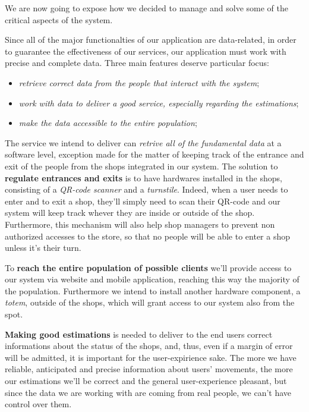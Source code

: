We are now going to expose how we decided to manage and solve some of the critical aspects of the system.

 Since all of the major functionalties of our application are data-related, in order to guarantee the effectiveness of our services, our application must work with precise and complete data. Three main features deserve particular focus:
\begin{itemize}[topsep=0pt]
    \item \textit{retrieve correct data from the people that interact with the system};
    \item \textit{work with data to deliver a good service, especially regarding the estimations};
    \item \textit{make the data accessible to the entire population};
\end{itemize}

The service we intend to deliver can \textit{retrive all of the fundamental data} at a software level, exception made for the matter of keeping track of the entrance and exit of the people from the shops integrated in our system. The solution to \textbf{regulate entrances and exits} is to have hardwares installed in the shops, consisting of a \textit{QR-code scanner} and a \textit{turnstile}. Indeed, when a user needs to enter and to exit a shop, they'll simply need to scan their QR-code and our system will keep track whever they are inside or outside of the shop. Furthermore, this mechanism will also help shop managers to prevent non authorized accesses to the store, so that no people will be able to enter a shop unless it's their turn.

To \textbf{reach the entire population of possible clients} we'll provide access to our system via website and mobile application, reaching this way the majority of the population. Furthermore we intend to install another hardware component, a \textit{totem}, outside of the shops, which will grant access to our system also from the spot.

\textbf{Making good estimations} is needed to deliver to the end users correct informations about the status of the shops, and, thus, even if a margin of error will be admitted, it is important for the user-expirience sake. The more we have reliable, anticipated and precise information about users' movements, the more our estimations we'll be correct and the general user-experience pleasant, but since the data we are working with are coming from real people, we can't have control over them. 

